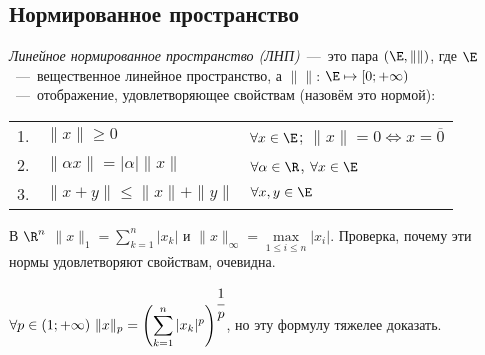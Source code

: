 \subsection{Нормированное пространство}

\begin{definition}
    \textit{Линейное нормированное пространство (ЛНП)}~---~это пара $(\E, \| \|)$, где $\E$~---~вещественное линейное пространство, а $\| \|$: $\E \mapsto [0; +\infty)$~---~отображение, удовлетворяющее свойствам (назовём это нормой):
    \begin{tabular}{lll}
    1. & $\| x\| \geq 0$ & $\forall x \in \E$; $\| x\| = 0 \Leftrightarrow x = \overline{0}$\\
    2. & $\| \alpha x \| = |\alpha| \| x\|$ & $\forall \alpha \in \R$, $\forall x \in \E$ \\
    3. & $\| x + y \| \leq \| x \| + \| y\|$ & $\forall x, y \in \E$  
    \end{tabular}
\end{definition}
\begin{example}
    В $\displaystyle \R^n$ $\displaystyle \| x\|_{1} = \sum_{k = 1}^{n} |x_{k}|$ и $\| x\|_{\infty} = \max\limits_{1 \leq i \leq n} |x_{i}|$. Проверка, почему эти нормы удовлетворяют свойствам, очевидна.
\end{example}
\begin{note}
    $\displaystyle \forall p \in (1; +\infty)\  \| x \|_p = \left( \sum_{k = 1}^{n} |x_k|^{p} \right)^{\cfrac{1}{p}}$, но эту формулу тяжелее доказать.
\end{note}